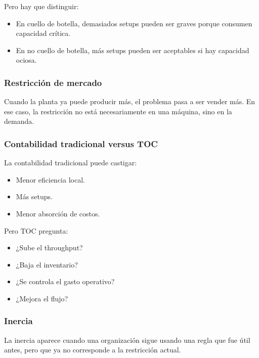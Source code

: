 \documentclass[
  11pt,
]{article}
\providecommand{\tightlist}{%
  \setlength{\itemsep}{0pt}\setlength{\parskip}{0pt}}
\begin{document}
Pero hay que distinguir:

\begin{itemize}
\tightlist
\item
  En cuello de botella, demasiados setups pueden ser graves porque
  consumen capacidad crítica.
\item
  En no cuello de botella, más setups pueden ser aceptables si hay
  capacidad ociosa.
\end{itemize}

\hypertarget{restricciuxf3n-de-mercado}{%
\subsubsection{Restricción de mercado}\label{restricciuxf3n-de-mercado}}

Cuando la planta ya puede producir más, el problema pasa a ser vender
más. En ese caso, la restricción no está necesariamente en una máquina,
sino en la demanda.

\hypertarget{contabilidad-tradicional-versus-toc}{%
\subsubsection{Contabilidad tradicional versus
TOC}\label{contabilidad-tradicional-versus-toc}}

La contabilidad tradicional puede castigar:

\begin{itemize}
\tightlist
\item
  Menor eficiencia local.
\item
  Más setups.
\item
  Menor absorción de costos.
\end{itemize}

Pero TOC pregunta:

\begin{itemize}
\tightlist
\item
  ¿Sube el throughput?
\item
  ¿Baja el inventario?
\item
  ¿Se controla el gasto operativo?
\item
  ¿Mejora el flujo?
\end{itemize}

\hypertarget{inercia}{%
\subsubsection{Inercia}\label{inercia}}

La inercia aparece cuando una organización sigue usando una regla que
fue útil antes, pero que ya no corresponde a la restricción actual.
\end{document}
